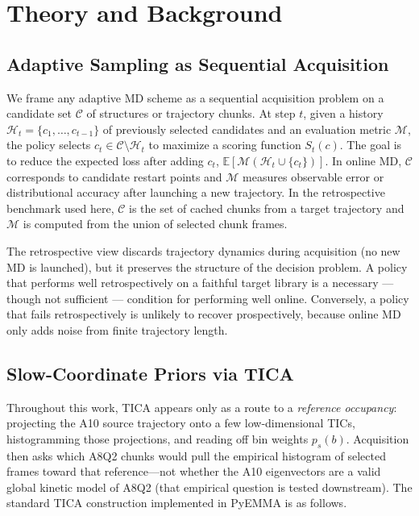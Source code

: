 \documentclass[journal=jctcce,manuscript=article,layout=twocolumn]{achemso}
\begin{document}
\section{Theory and Background}

\subsection{Adaptive Sampling as Sequential Acquisition}

We frame any adaptive MD scheme as a sequential acquisition problem on a candidate set $\mathcal{C}$ of structures or trajectory chunks.
At step $t$, given a history $\mathcal{H}_t = \{c_1,\ldots,c_{t-1}\}$ of previously selected candidates and an evaluation metric $\mathcal{M}$, the policy selects $c_t \in \mathcal{C}\setminus\mathcal{H}_t$ to maximize a scoring function $S_t(c)$.
The goal is to reduce the expected loss after adding $c_t$, $\mathbb{E}[\mathcal{M}(\mathcal{H}_t \cup \{c_t\})]$.
In online MD, $\mathcal{C}$ corresponds to candidate restart points and $\mathcal{M}$ measures observable error or distributional accuracy after launching a new trajectory.
In the retrospective benchmark used here, $\mathcal{C}$ is the set of cached chunks from a target trajectory and $\mathcal{M}$ is computed from the union of selected chunk frames.

The retrospective view discards trajectory dynamics during acquisition (no new MD is launched), but it preserves the structure of the decision problem. A policy that performs well retrospectively on a faithful target library is a necessary --- though not sufficient --- condition for performing well online. Conversely, a policy that fails retrospectively is unlikely to recover prospectively, because online MD only adds noise from finite trajectory length.

\subsection{Slow-Coordinate Priors via TICA}

Throughout this work, TICA appears only as a route to a \emph{reference occupancy}: projecting the A10 source trajectory onto a few low-dimensional TICs, histogramming those projections, and reading off bin weights $p_s(b)$. Acquisition then asks which A8Q2 chunks would pull the empirical histogram of selected frames toward that reference---not whether the A10 eigenvectors are a valid global kinetic model of A8Q2 (that empirical question is tested downstream). The standard TICA construction implemented in PyEMMA is as follows.
\end{document}
